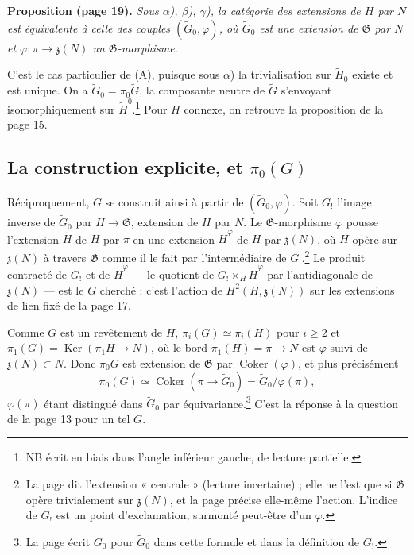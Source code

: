 \documentclass[11pt,a4paper]{article}
\begin{document}
\textbf{Proposition (page 19).} \emph{Sous $\alpha$), $\beta$), $\gamma$), la
catégorie des extensions de $H$ par $N$ est équivalente à celle des couples
$(\widetilde{G}_0, \varphi)$, où $\widetilde{G}_0$ est une extension de
$\mathfrak{G}$ par $N$ et $\varphi : \pi \to \mathfrak{z}(N)$ un
$\mathfrak{G}$-morphisme.}

C'est le cas particulier de (A), puisque sous $\alpha$) la trivialisation
sur $\widetilde{H}_0$ existe et est unique. On a $\widetilde{G}_0 = \pi_0
\widetilde{G}$, la composante neutre de $\widetilde{G}$ s'envoyant
isomorphiquement sur $\widetilde{H}^0$.\footnote{NB écrit en biais dans
l'angle inférieur gauche, de lecture partielle.} Pour $H$ connexe, on
retrouve la proposition de la page 15.

\subsection*{La construction explicite, et $\pi_0(G)$}

Réciproquement, $G$ se construit ainsi à partir de $(\widetilde{G}_0,
\varphi)$. Soit $G_!$ l'image inverse de $\widetilde{G}_0$ par $H \to
\mathfrak{G}$, extension de $H$ par $N$. Le $\mathfrak{G}$-morphisme
$\varphi$ pousse l'extension $\widetilde{H}$ de $H$ par $\pi$ en une
extension $\widetilde{H}^{\varphi}$ de $H$ par $\mathfrak{z}(N)$, où $H$ opère
sur $\mathfrak{z}(N)$ à travers $\mathfrak{G}$ comme il le fait par
l'intermédiaire de $G_!$.\footnote{La page dit l'extension « centrale »
(lecture incertaine) ; elle ne l'est que si $\mathfrak{G}$ opère
trivialement sur $\mathfrak{z}(N)$, et la page précise elle-même l'action.
L'indice de $G_!$ est un point d'exclamation, surmonté peut-être d'un
$\varphi$.} Le produit contracté de $G_!$ et de $\widetilde{H}^{\varphi}$
— le quotient de $G_! \times_H \widetilde{H}^{\varphi}$ par l'antidiagonale de
$\mathfrak{z}(N)$ — est le $G$ cherché : c'est l'action de
$H^2(H, \mathfrak{z}(N))$ sur les extensions de lien fixé de la page 17.

Comme $G$ est un revêtement de $H$, $\pi_i(G) \simeq \pi_i(H)$ pour $i
\geqslant 2$ et $\pi_1(G) = \operatorname{Ker}(\pi_1 H \to N)$, où le bord
$\pi_1(H) = \pi \to N$ est $\varphi$ suivi de $\mathfrak{z}(N) \subset N$.
Donc $\pi_0 G$ est extension de $\mathfrak{G}$ par
$\operatorname{Coker}(\varphi)$, et plus précisément
\[
  \pi_0(G) \simeq \operatorname{Coker}(\pi \to \widetilde{G}_0) =
  \widetilde{G}_0 / \varphi(\pi) ,
\]
$\varphi(\pi)$ étant distingué dans $\widetilde{G}_0$ par
équivariance.\footnote{La page écrit $G_0$ pour $\widetilde{G}_0$ dans cette
formule et dans la définition de $G_!$.} C'est la réponse à la question de
la page 13 pour un tel $G$.
\end{document}
